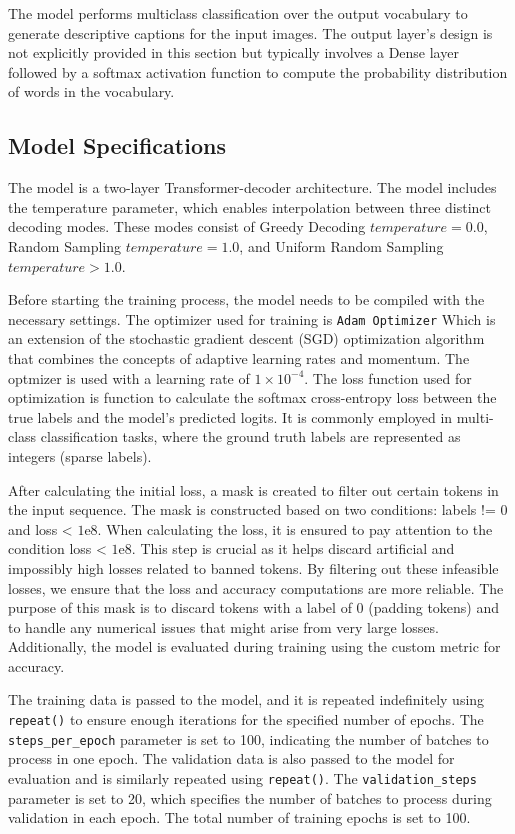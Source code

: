 \documentclass[runningheads]{llncs}
\begin{document}
The model performs multiclass classification over the output vocabulary to generate descriptive captions for the input images. The output layer's design is not explicitly provided in this section but typically involves a Dense layer followed by a softmax activation function to compute the probability distribution of words in the vocabulary.

\subsection{Model Specifications}

The model is a two-layer Transformer-decoder architecture. The model includes the temperature parameter, which enables interpolation between three distinct decoding modes. These modes consist of Greedy Decoding $temperature = 0.0$, Random Sampling $temperature = 1.0$, and Uniform Random Sampling $temperature > 1.0$.

Before starting the training process, the model needs to be compiled with the necessary settings. The optimizer used for training is \texttt{Adam Optimizer} Which is an extension of the stochastic gradient descent (SGD) optimization algorithm that combines the concepts of adaptive learning rates and momentum. The optmizer is used with a learning rate of $1 \times 10^{-4}$. The loss function used for optimization is  function to calculate the softmax cross-entropy loss between the true labels and the model's predicted logits. It is commonly employed in multi-class classification tasks, where the ground truth labels are represented as integers (sparse labels).

After calculating the initial loss, a mask is created to filter out certain tokens in the input sequence. The mask is constructed based on two conditions: labels != 0 and loss < $1 \mathrm{e} 8$. When calculating the loss, it is ensured to pay attention to the condition loss < $1 \mathrm{e} 8$. This step is crucial as it helps discard artificial and impossibly high losses related to banned tokens. By filtering out these infeasible losses, we ensure that the loss and accuracy computations are more reliable. The purpose of this mask is to discard tokens with a label of 0 (padding tokens) and to handle any numerical issues that might arise from very large losses. Additionally, the model is evaluated during training using the custom metric for accuracy.

The training data is passed to the model, and it is repeated indefinitely using \texttt{repeat()} to ensure enough iterations for the specified number of epochs. The \texttt{steps\_per\_epoch} parameter is set to 100, indicating the number of batches to process in one epoch. The validation data is also passed to the model for evaluation and is similarly repeated using \texttt{repeat()}. The \texttt{validation\_steps} parameter is set to 20, which specifies the number of batches to process during validation in each epoch. The total number of training epochs is set to 100. 
\end{document}
